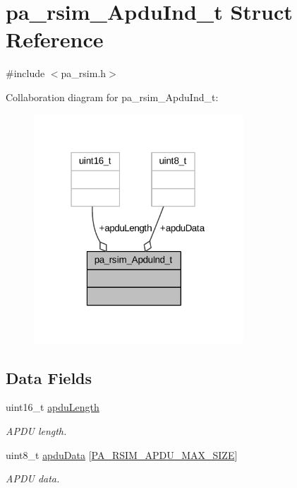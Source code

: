 \hypertarget{structpa__rsim___apdu_ind__t}{}\section{pa\+\_\+rsim\+\_\+\+Apdu\+Ind\+\_\+t Struct Reference}
\label{structpa__rsim___apdu_ind__t}


{\ttfamily \#include $<$pa\+\_\+rsim.\+h$>$}



Collaboration diagram for pa\+\_\+rsim\+\_\+\+Apdu\+Ind\+\_\+t\+:
\nopagebreak
\begin{figure}[H]
\begin{center}
\leavevmode
\includegraphics[width=223pt]{structpa__rsim___apdu_ind__t__coll__graph}
\end{center}
\end{figure}
\subsection*{Data Fields}
\begin{DoxyCompactItemize}
\item 
uint16\+\_\+t \hyperlink{structpa__rsim___apdu_ind__t_a34c78b1223b92313960a0b1d489ced18}{apdu\+Length}
\begin{DoxyCompactList}\small\item\em A\+P\+DU length. \end{DoxyCompactList}\item 
uint8\+\_\+t \hyperlink{structpa__rsim___apdu_ind__t_ab3a60e9c51bb1162704c6fa0ea835d37}{apdu\+Data} \mbox{[}\hyperlink{pa__rsim_8h_a17dfb12339c351317fe14197fabbabae}{P\+A\+\_\+\+R\+S\+I\+M\+\_\+\+A\+P\+D\+U\+\_\+\+M\+A\+X\+\_\+\+S\+I\+ZE}\mbox{]}
\begin{DoxyCompactList}\small\item\em A\+P\+DU data. \end{DoxyCompactList}\end{DoxyCompactItemize}


